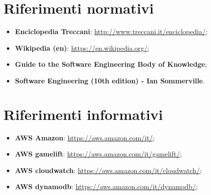 \section{Riferimenti normativi}

\begin{itemize}
\item \textbf{Enciclopedia Treccani}: \url{http://www.treccani.it/enciclopedia/};
\item \textbf{Wikipedia (en)}: \url{https://en.wikipedia.org/};
\item \textbf{Guide to the Software Engineering Body of Knowledge};
\item \textbf{Software Engineering (10th edition) - Ian Sommerville}.
\end{itemize}

\section{Riferimenti informativi}

\begin{itemize}
\item \textbf{AWS Amazon}: \url{https://aws.amazon.com/it/};
\item \textbf{AWS gamelift}: \url{https://aws.amazon.com/it/gamelift/};
\item \textbf{AWS cloudwatch}: \url{https://aws.amazon.com/it/cloudwatch/};
\item \textbf{AWS dynamodb}: \url{https://aws.amazon.com/it/dynamodb/};

\end{itemize}


\clearpage